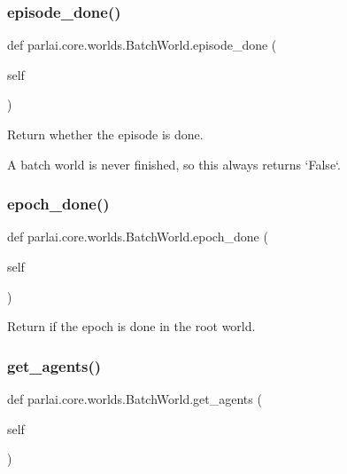 \subsubsection{\texorpdfstring{episode\+\_\+done()}{episode\_done()}}
{\footnotesize\ttfamily def parlai.\+core.\+worlds.\+Batch\+World.\+episode\+\_\+done (\begin{DoxyParamCaption}\item[{}]{self }\end{DoxyParamCaption})}

\begin{DoxyVerb}Return whether the episode is done.

A batch world is never finished, so this always returns `False`.
\end{DoxyVerb}
 \mbox{\label{classparlai_1_1core_1_1worlds_1_1BatchWorld_a006891b1446ef6e593edda1c91cab809}} 
\subsubsection{\texorpdfstring{epoch\+\_\+done()}{epoch\_done()}}
{\footnotesize\ttfamily def parlai.\+core.\+worlds.\+Batch\+World.\+epoch\+\_\+done (\begin{DoxyParamCaption}\item[{}]{self }\end{DoxyParamCaption})}

\begin{DoxyVerb}Return if the epoch is done in the root world.
\end{DoxyVerb}
 \mbox{\label{classparlai_1_1core_1_1worlds_1_1BatchWorld_a1fc7faff8ccc60606ccff891d36e6b86}} 
\subsubsection{\texorpdfstring{get\+\_\+agents()}{get\_agents()}}
{\footnotesize\ttfamily def parlai.\+core.\+worlds.\+Batch\+World.\+get\+\_\+agents (\begin{DoxyParamCaption}\item[{}]{self }\end{DoxyParamCaption})}

